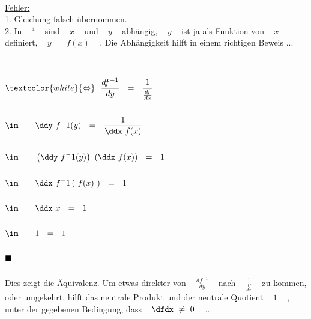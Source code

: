 \begin{description}[leftmargin=*, labelsep=3em, itemsep=3em]
	~\\	
	
	\underline{Fehler:} \\
	
	1. Gleichung falsch übernommen. \\
	
	2. In ~ $^{4}$ ~ sind ~ $x$ ~ und ~ $y$ ~ abhängig, ~ $y$ ~ ist ja als Funktion von ~ $x$ ~ definiert, ~ $y ~ = ~ f(x)$ ~ . Die Abhängigkeit hilft in einem richtigen Beweis ...
	
	~\\

	\setcounter{tc}{0}
	
	$\begin{aligned}[t]
	&\textcolor{white}{\Leftrightarrow} ~~ \frac{df^{-1}}{dy} ~~ = ~~ \frac{1}{ \frac{df}{dx} } \\ \\
	&\im \qquad \ddy ~ f^-1(y) ~~ = ~~ \frac{1}{ \ddx ~ f(x) } \\ \\
	&\im \qquad \left( \ddy ~ f^-1(y) \right) ~ \left( \ddx ~ f(x) \right) ~~ = ~~ 1 \\ \\
	&\im \qquad \ddx ~ f^-1\left( ~ f(x) ~ \right) ~~ = ~~ 1 \\ \\
	&\im \qquad \ddx ~ x ~~ = ~~ 1 \\ \\
	&\im \qquad 1 ~~ = ~~ 1 \\ \\
	&\blacksquare
	\end{aligned}$ \\
	
	~\\
	
	Dies zeigt die Äquivalenz. Um etwas direkter von ~ $\frac{df^{-1}}{dy}$ ~ nach ~ $\frac{1}{ \frac{df}{dx} }$ ~ zu kommen, oder umgekehrt, hilft das neutrale Produkt und der neutrale Quotient ~ $1$ ~ , unter der gegebenen Bedingung, dass ~ $\dfdx ~ \neq ~ 0$ ~ ...
	
	
	\newpage
	

\end{description}
